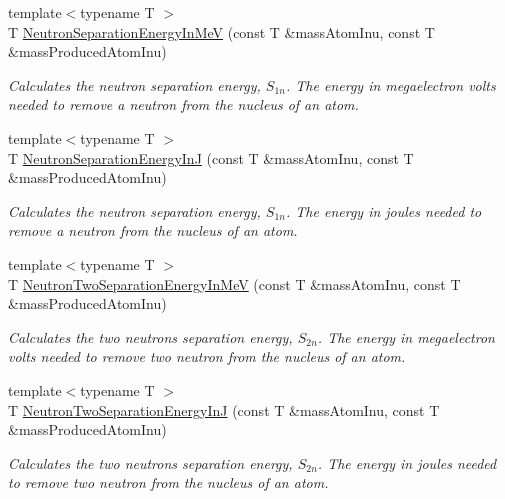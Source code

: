 \begin{DoxyCompactItemize}
{\footnotesize template$<$typename T $>$ }\\T \mbox{\hyperlink{group___e_g_x_phys-_nuclear_separation_energy_ga66133edb5809c81dd9fd60e09ebbef79}{Neutron\+Separation\+Energy\+In\+MeV}} (const T \&mass\+Atom\+Inu, const T \&mass\+Produced\+Atom\+Inu)
\begin{DoxyCompactList}\small\item\em Calculates the neutron separation energy, $S_{1n}$. The energy in megaelectron volts needed to remove a neutron from the nucleus of an atom. \end{DoxyCompactList}\item 
{\footnotesize template$<$typename T $>$ }\\T \mbox{\hyperlink{group___e_g_x_phys-_nuclear_separation_energy_ga14a4bb972ae000ef4ff35f2734ff22d0}{Neutron\+Separation\+Energy\+InJ}} (const T \&mass\+Atom\+Inu, const T \&mass\+Produced\+Atom\+Inu)
\begin{DoxyCompactList}\small\item\em Calculates the neutron separation energy, $S_{1n}$. The energy in joules needed to remove a neutron from the nucleus of an atom. \end{DoxyCompactList}\item 
{\footnotesize template$<$typename T $>$ }\\T \mbox{\hyperlink{group___e_g_x_phys-_nuclear_separation_energy_ga09985fc876eb632695bfbc1f2f325401}{Neutron\+Two\+Separation\+Energy\+In\+MeV}} (const T \&mass\+Atom\+Inu, const T \&mass\+Produced\+Atom\+Inu)
\begin{DoxyCompactList}\small\item\em Calculates the two neutrons separation energy, $S_{2n}$. The energy in megaelectron volts needed to remove two neutron from the nucleus of an atom. \end{DoxyCompactList}\item 
{\footnotesize template$<$typename T $>$ }\\T \mbox{\hyperlink{group___e_g_x_phys-_nuclear_separation_energy_ga293ac9428420a0adf4235048dbe529b4}{Neutron\+Two\+Separation\+Energy\+InJ}} (const T \&mass\+Atom\+Inu, const T \&mass\+Produced\+Atom\+Inu)
\begin{DoxyCompactList}\small\item\em Calculates the two neutrons separation energy, $S_{2n}$. The energy in joules needed to remove two neutron from the nucleus of an atom. \end{DoxyCompactList}\item 

\end{DoxyCompactItemize}
